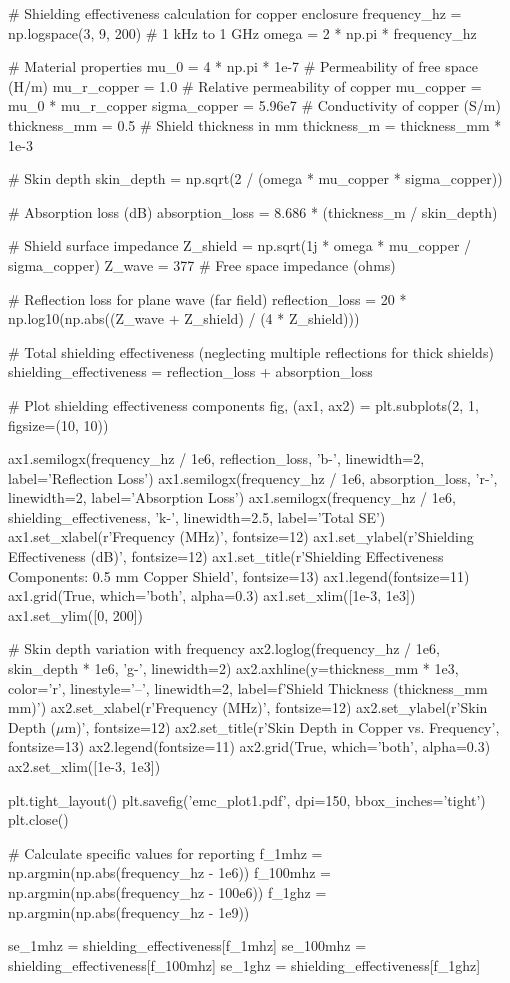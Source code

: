 \documentclass[11pt,a4paper]{article}
\begin{document}
\begin{pycode}
# Shielding effectiveness calculation for copper enclosure
frequency_hz = np.logspace(3, 9, 200)  # 1 kHz to 1 GHz
omega = 2 * np.pi * frequency_hz

# Material properties
mu_0 = 4 * np.pi * 1e-7  # Permeability of free space (H/m)
mu_r_copper = 1.0  # Relative permeability of copper
mu_copper = mu_0 * mu_r_copper
sigma_copper = 5.96e7  # Conductivity of copper (S/m)
thickness_mm = 0.5  # Shield thickness in mm
thickness_m = thickness_mm * 1e-3

# Skin depth
skin_depth = np.sqrt(2 / (omega * mu_copper * sigma_copper))

# Absorption loss (dB)
absorption_loss = 8.686 * (thickness_m / skin_depth)

# Shield surface impedance
Z_shield = np.sqrt(1j * omega * mu_copper / sigma_copper)
Z_wave = 377  # Free space impedance (ohms)

# Reflection loss for plane wave (far field)
reflection_loss = 20 * np.log10(np.abs((Z_wave + Z_shield) / (4 * Z_shield)))

# Total shielding effectiveness (neglecting multiple reflections for thick shields)
shielding_effectiveness = reflection_loss + absorption_loss

# Plot shielding effectiveness components
fig, (ax1, ax2) = plt.subplots(2, 1, figsize=(10, 10))

ax1.semilogx(frequency_hz / 1e6, reflection_loss, 'b-', linewidth=2, label='Reflection Loss')
ax1.semilogx(frequency_hz / 1e6, absorption_loss, 'r-', linewidth=2, label='Absorption Loss')
ax1.semilogx(frequency_hz / 1e6, shielding_effectiveness, 'k-', linewidth=2.5, label='Total SE')
ax1.set_xlabel(r'Frequency (MHz)', fontsize=12)
ax1.set_ylabel(r'Shielding Effectiveness (dB)', fontsize=12)
ax1.set_title(r'Shielding Effectiveness Components: 0.5 mm Copper Shield', fontsize=13)
ax1.legend(fontsize=11)
ax1.grid(True, which='both', alpha=0.3)
ax1.set_xlim([1e-3, 1e3])
ax1.set_ylim([0, 200])

# Skin depth variation with frequency
ax2.loglog(frequency_hz / 1e6, skin_depth * 1e6, 'g-', linewidth=2)
ax2.axhline(y=thickness_mm * 1e3, color='r', linestyle='--', linewidth=2, label=f'Shield Thickness ({thickness_mm} mm)')
ax2.set_xlabel(r'Frequency (MHz)', fontsize=12)
ax2.set_ylabel(r'Skin Depth ($\mu$m)', fontsize=12)
ax2.set_title(r'Skin Depth in Copper vs. Frequency', fontsize=13)
ax2.legend(fontsize=11)
ax2.grid(True, which='both', alpha=0.3)
ax2.set_xlim([1e-3, 1e3])

plt.tight_layout()
plt.savefig('emc_plot1.pdf', dpi=150, bbox_inches='tight')
plt.close()

# Calculate specific values for reporting
f_1mhz = np.argmin(np.abs(frequency_hz - 1e6))
f_100mhz = np.argmin(np.abs(frequency_hz - 100e6))
f_1ghz = np.argmin(np.abs(frequency_hz - 1e9))

se_1mhz = shielding_effectiveness[f_1mhz]
se_100mhz = shielding_effectiveness[f_100mhz]
se_1ghz = shielding_effectiveness[f_1ghz]
\end{pycode}
\end{document}
